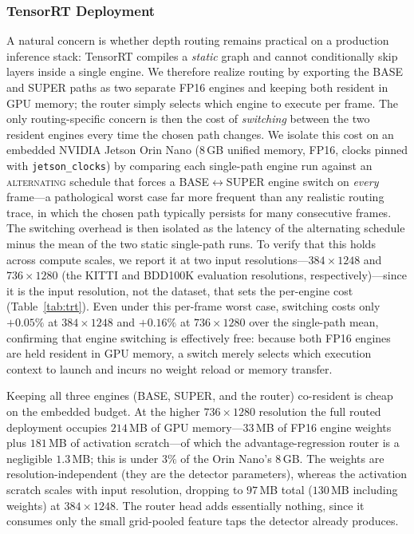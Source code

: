 \subsubsection{TensorRT Deployment}
\label{sec:results_trt}
A natural concern is whether depth routing remains practical on a production inference stack: TensorRT compiles a \emph{static} graph and cannot conditionally skip layers inside a single engine.
We therefore realize routing by exporting the BASE and SUPER paths as two separate FP16 engines and keeping both resident in GPU memory; the router simply selects which engine to execute per frame.
The only routing-specific concern is then the cost of \emph{switching} between the two resident engines every time the chosen path changes.
We isolate this cost on an embedded NVIDIA Jetson Orin Nano (8\,GB unified memory, FP16, clocks pinned with \texttt{jetson\_clocks}) by comparing each single-path engine run against an \textsc{alternating} schedule that forces a BASE$\leftrightarrow$SUPER engine switch on \emph{every} frame---a pathological worst case far more frequent than any realistic routing trace, in which the chosen path typically persists for many consecutive frames.
The switching overhead is then isolated as the latency of the alternating schedule minus the mean of the two static single-path runs.
To verify that this holds across compute scales, we report it at two input resolutions---$384\times1248$ and $736\times1280$ (the KITTI and BDD100K evaluation resolutions, respectively)---since it is the input resolution, not the dataset, that sets the per-engine cost (Table~\ref{tab:trt}).
Even under this per-frame worst case, switching costs only $+0.05\%$ at $384\times1248$ and $+0.16\%$ at $736\times1280$ over the single-path mean, confirming that engine switching is effectively free: because both FP16 engines are held resident in GPU memory, a switch merely selects which execution context to launch and incurs no weight reload or memory transfer.

Keeping all three engines (BASE, SUPER, and the router) co-resident is cheap on the embedded budget.
At the higher $736\times1280$ resolution the full routed deployment occupies $214$\,MB of GPU memory---$33$\,MB of FP16 engine weights plus $181$\,MB of activation scratch---of which the advantage-regression router is a negligible $1.3$\,MB; this is under $3\%$ of the Orin Nano's $8$\,GB.
The weights are resolution-independent (they are the detector parameters), whereas the activation scratch scales with input resolution, dropping to $97$\,MB total ($130$\,MB including weights) at $384\times1248$.
The router head adds essentially nothing, since it consumes only the small grid-pooled feature taps the detector already produces.

